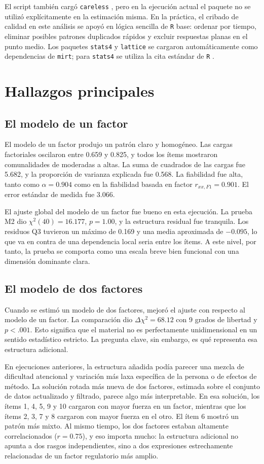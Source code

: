 \documentclass[11pt,a4paper]{article}
\begin{document}
El script también cargó \texttt{careless} \parencite{YentesWilhelm2023careless}, pero en la ejecución actual el paquete no se utilizó explícitamente en la estimación misma. En la práctica, el cribado de calidad en este análisis se apoyó en lógica sencilla de \texttt{R} base: ordenar por tiempo, eliminar posibles patrones duplicados rápidos y excluir respuestas planas en el punto medio. Los paquetes \texttt{stats4} y \texttt{lattice} \parencite{Sarkar2008lattice} se cargaron automáticamente como dependencias de \texttt{mirt}; para \texttt{stats4} se utiliza la cita estándar de \texttt{R} \parencite{RCore2026}.

\section{Hallazgos principales}
\subsection{El modelo de un factor}
El modelo de un factor produjo un patrón claro y homogéneo. Las cargas factoriales oscilaron entre 0.659 y 0.825, y todos los ítems mostraron comunalidades de moderadas a altas. La suma de cuadrados de las cargas fue 5.682, y la proporción de varianza explicada fue 0.568. La fiabilidad fue alta, tanto como $\alpha = 0.904$ como en la fiabilidad basada en factor $r_{xx,F1} = 0.901$. El error estándar de medida fue 3.066.

El ajuste global del modelo de un factor fue bueno en esta ejecución. La prueba M2 dio $\chi^2(40)=16.177$, $p=1.00$, y la estructura residual fue tranquila. Los residuos Q3 tuvieron un máximo de 0.169 y una media aproximada de $-0.095$, lo que va en contra de una dependencia local seria entre los ítems. A este nivel, por tanto, la prueba se comporta como una escala breve bien funcional con una dimensión dominante clara.

\subsection{El modelo de dos factores}
Cuando se estimó un modelo de dos factores, mejoró el ajuste con respecto al modelo de un factor. La comparación dio $\Delta \chi^2 = 68.12$ con 9 grados de libertad y $p < .001$. Esto significa que el material no es perfectamente unidimensional en un sentido estadístico estricto. La pregunta clave, sin embargo, es qué representa esa estructura adicional.

En ejecuciones anteriores, la estructura añadida podía parecer una mezcla de dificultad atencional y variación más laxa específica de la persona o de efectos de método. La solución rotada más nueva de dos factores, estimada sobre el conjunto de datos actualizado y filtrado, parece algo más interpretable. En esa solución, los ítems 1, 4, 5, 9 y 10 cargaron con mayor fuerza en un factor, mientras que los ítems 2, 3, 7 y 8 cargaron con mayor fuerza en el otro. El ítem 6 mostró un patrón más mixto. Al mismo tiempo, los dos factores estaban altamente correlacionados ($r = 0.75$), y eso importa mucho: la estructura adicional no apunta a dos rasgos independientes, sino a dos expresiones estrechamente relacionadas de un factor regulatorio más amplio.
\end{document}
